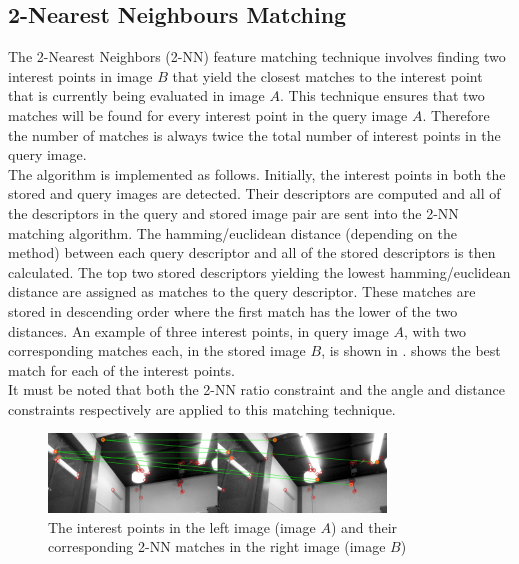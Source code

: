 \documentclass[11pt]{report}
\begin{document}
\subsection{2-Nearest Neighbours Matching}
\label{sec:knn}
The 2-Nearest Neighbors (2-NN) feature matching technique involves finding two interest points  in image $B$ that yield the closest matches to the interest point that is currently being evaluated in image $A$. This technique ensures that two matches will be found for every interest point in the query image $A$. Therefore the number of matches is always twice the total number of interest points in the query image.\\

The algorithm is implemented as follows. Initially, the interest points in both the stored and query images are detected. Their descriptors are computed and all of the descriptors in the query and stored image pair are sent into the 2-NN matching algorithm. The hamming/euclidean distance (depending on the method) between each query descriptor and all of the stored descriptors is then calculated. The top two stored descriptors yielding the lowest hamming/euclidean distance are assigned as matches to the query descriptor. These matches are stored in descending order where the first match has the lower of the two distances. An example of three interest points, in query image $A$, with two corresponding matches each, in the stored image $B$, is shown in .  shows the best match for each of the interest points.\\

It must be noted that both the 2-NN ratio constraint and the angle and distance constraints respectively are applied to this matching technique.\\

 \begin{figure}[h!] 
  \centering
    \includegraphics[width=0.8\textwidth]{../Drawings/Matching/feature_matching/dataset1_without_validation_knn.jpg}
    \caption{The interest points in the left image (image $A$) and their corresponding 2-NN matches in the right image (image $B$)}
    \label{fig:2nn_matching}
\end{figure}
\end{document}
